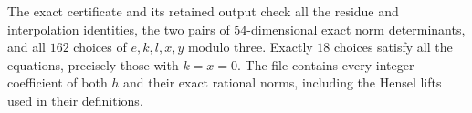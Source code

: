 The exact certificate
 and its
retained output check all the residue and interpolation
identities, the two pairs of $54$-dimensional exact
norm determinants, and all $162$ choices of
$e,k,l,x,y$ modulo three.
Exactly $18$ choices satisfy all the equations,
precisely those with $k=x=0$.
The file 
contains every integer coefficient of both $h$ and
their exact rational norms, including the Hensel
lifts used in their definitions.
